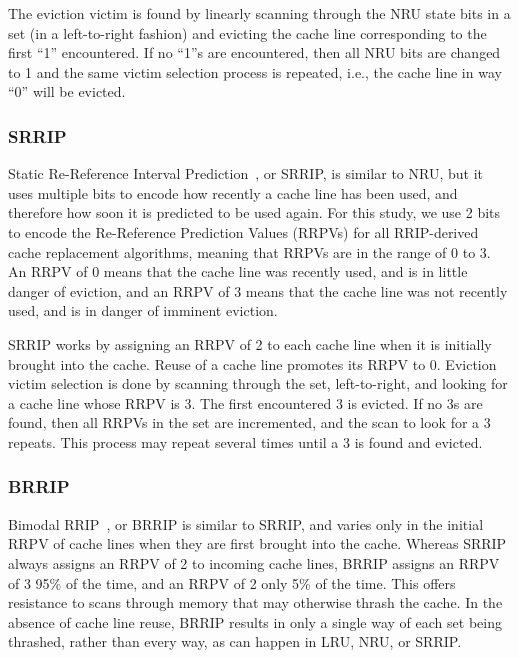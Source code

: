 The eviction victim is found by linearly scanning through the NRU state bits in a set (in a left-to-right fashion) and evicting the cache line corresponding to the first ``1'' encountered. 
If no ``1''s are encountered, then all NRU bits are changed to 1 and the same victim selection process is repeated, i.e., the cache line in way ``0'' will be evicted.



\subsubsection{SRRIP}

Static Re-Reference Interval Prediction~\cite{jaleeltheobald10}, or SRRIP, is similar to NRU, but it uses multiple bits to encode how recently a cache line has been used, and therefore how soon it is predicted to be used again.  For this study, we use 2 bits to encode the Re-Reference Prediction Values (RRPVs) for all RRIP-derived cache replacement algorithms, meaning that RRPVs are in the range of 0 to 3.  An RRPV of 0 means that the cache line was recently used, and is in little danger of eviction, and an RRPV of 3 means that the cache line was not recently used, and is in danger of imminent eviction.

SRRIP works by assigning an RRPV of 2 to each cache line when it is initially brought into the cache.  Reuse of a cache line promotes its RRPV to 0.  Eviction victim selection is done by scanning through the set, left-to-right, and looking for a cache line whose RRPV is 3.  The first encountered 3 is evicted.  If no 3s are found, then all RRPVs in the set are incremented, and the scan to look for a 3 repeats.  This process may repeat several times until a 3 is found and evicted.

\subsubsection{BRRIP}

Bimodal RRIP~\cite{jaleeltheobald10}, or BRRIP is similar to SRRIP, and varies only in the initial RRPV of cache lines when they are first brought into the cache.  Whereas SRRIP always assigns an RRPV of 2 to incoming cache lines, BRRIP assigns an RRPV of 3 95\% of the time, and an RRPV of 2 only 5\% of the time.  This offers resistance to scans through memory that may otherwise thrash the cache.  In the absence of cache line reuse, BRRIP results in only a single way of each set being thrashed, rather than every way, as can happen in LRU, NRU, or SRRIP.

